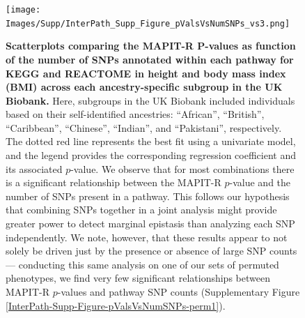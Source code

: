 \documentclass[10pt]{article}
\begin{document}

\begin{landscape}
\begin{figure}[htbp]
\centering
\vspace*{-2.2cm}
\texttt{[image: Images/Supp/InterPath\_Supp\_Figure\_pValsVsNumSNPs\_vs3.png]}
\caption{\textbf{Scatterplots comparing the MAPIT-R $\bm{P}$-values as function of the number of SNPs annotated within each pathway for KEGG and REACTOME in height and body mass index (BMI) across each ancestry-specific subgroup in the UK Biobank.} Here, subgroups in the UK Biobank included individuals based on their self-identified ancestries: ``African'', ``British'', ``Caribbean'', ``Chinese'', ``Indian'', and ``Pakistani'', respectively. The dotted red line represents the best fit using a univariate model, and the legend provides the corresponding regression coefficient and its associated $p$-value. We observe that for most combinations there is a significant relationship between the MAPIT-R $p$-value and the number of SNPs present in a pathway. This follows our hypothesis that combining SNPs together in a joint analysis might provide greater power to detect marginal epistasis than analyzing each SNP independently. We note, however, that these results appear to not solely be driven just by the presence or absence of large SNP counts --- conducting this same analysis on one of our sets of permuted phenotypes, we find very few significant relationships between MAPIT-R $p$-values and pathway SNP counts (Supplementary Figure \ref{InterPath-Supp-Figure-pValsVsNumSNPs-perm1}).}
\label{InterPath-Supp-Figure-pValsVsNumSNPs}
\end{figure}
\clearpage
\end{landscape}

\end{document}
